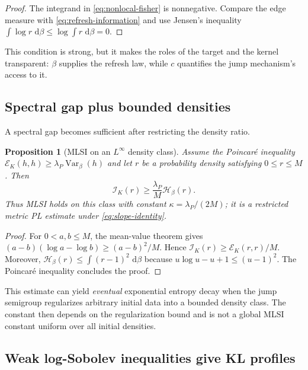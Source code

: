 \documentclass[11pt]{article}
\newtheorem{proposition}[theorem]{Proposition}
\theoremstyle{definition}
\DeclareMathOperator{\Var}{Var}
\newcommand{\dd}{\,\mathrm d}
\newcommand{\cE}{\mathcal E}
\newcommand{\cI}{\mathcal I}
\newcommand{\cH}{\mathcal H}
\begin{document}
\begin{proof}
The integrand in \eqref{eq:nonlocal-fisher} is nonnegative.  Compare the
edge measure with \eqref{eq:refresh-information} and use Jensen's inequality
$\int\log r\,\dd\beta\leq\log\int r\,\dd\beta=0$.
\end{proof}

This condition is strong, but it makes the roles of the target and the kernel
transparent: $\beta$ supplies the refresh law, while $c$ quantifies the jump
mechanism's access to it.

\subsection{Spectral gap plus bounded densities}

A spectral gap becomes sufficient after restricting the density ratio.

\begin{proposition}[MLSI on an $L^\infty$ density class]
\label{prop:bounded-density-pl}
Assume the Poincar\'e inequality
$\cE_K(h,h)\geq\lambda_P\Var_\beta(h)$ and let
$r$ be a probability density satisfying $0\leq r\leq M$.  Then
\begin{equation}\label{eq:bounded-density-mlsi}
  \cI_K(r)
  \geq \frac{\lambda_P}{M}\cH_\beta(r).
\end{equation}
Thus MLSI holds on this class with constant
$\kappa=\lambda_P/(2M)$; it is a restricted metric PL estimate under
\eqref{eq:slope-identity}.
\end{proposition}

\begin{proof}
For $0<a,b\leq M$, the mean-value theorem gives
$(a-b)(\log a-\log b)\geq(a-b)^2/M$.  Hence
$\cI_K(r)\geq\cE_K(r,r)/M$.  Moreover,
$\cH_\beta(r)\leq\int(r-1)^2\,\dd\beta$ because
$u\log u-u+1\leq(u-1)^2$.  The Poincar\'e inequality concludes the proof.
\end{proof}

This estimate can yield \emph{eventual} exponential entropy decay when the
jump semigroup regularizes arbitrary initial data into a bounded density
class.  The constant then depends on the regularization bound and is not a
global MLSI constant uniform over all initial densities.

\subsection{Weak log-Sobolev inequalities give KL profiles}
\end{document}
